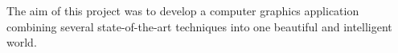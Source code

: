 The aim of this project was to develop a computer graphics application combining several state-of-the-art techniques into one beautiful and intelligent world. 
